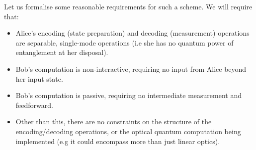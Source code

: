 \documentclass[aps, rmp, twocolumn, amsmath, amssymb, nofootinbib, superscriptaddress, longbibliography, floatfix, table-of-contents, eqsecnum]{revtex4-1}
\begin{document}
Let us formalise some reasonable requirements for such a scheme. We will require that:
\begin{itemize}
\item Alice's encoding (state preparation) and decoding (measurement) operations are separable, single-mode operations (i.e she has no quantum power of entanglement at her disposal).
\item Bob's computation is non-interactive, requiring no input from Alice beyond her input state.
\item Bob's computation is passive, requiring no intermediate measurement and feedforward.
\item Other than this, there are no constraints on the structure of the encoding/decoding operations, or the optical quantum computation being implemented (e.g it could encompass more than just linear optics).
\end{itemize}
\end{document}
